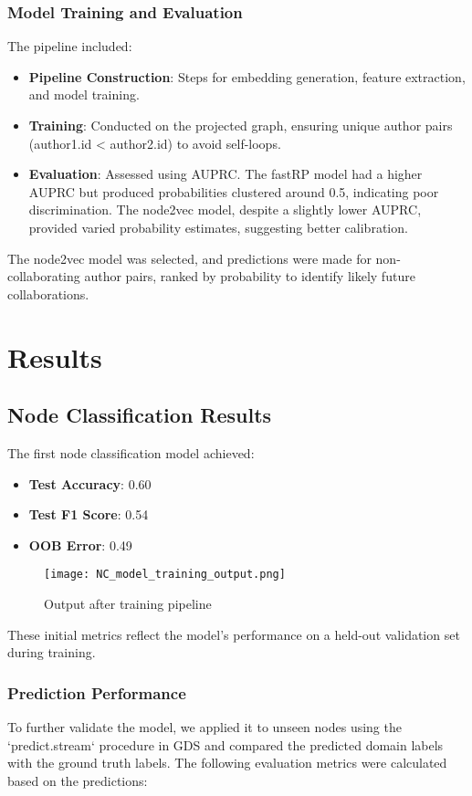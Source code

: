 \documentclass[conference, 12pt]{IEEEtran}
\begin{document}
\subsubsection{Model Training and Evaluation}
The pipeline included:
\begin{itemize}
  \item \textbf{Pipeline Construction}: Steps for embedding generation, feature extraction, and model training.
  \item \textbf{Training}: Conducted on the projected graph, ensuring unique author pairs (author1.id < author2.id) to avoid self-loops.
  \item \textbf{Evaluation}: Assessed using AUPRC. The fastRP model had a higher AUPRC but produced probabilities clustered around 0.5, indicating poor discrimination. The node2vec model, despite a slightly lower AUPRC, provided varied probability estimates, suggesting better calibration.
\end{itemize}
The node2vec model was selected, and predictions were made for non-collaborating author pairs, ranked by probability to identify likely future collaborations.

\section{Results}

\subsection{Node Classification Results}
The first node classification model achieved:
\begin{itemize}
  \item \textbf{Test Accuracy}: 0.60
  \item \textbf{Test F1 Score}: 0.54
  \item \textbf{OOB Error}: 0.49
\end{itemize}

\begin{figure}[h]
    \centering
    \texttt{[image: NC\_model\_training\_output.png]} 
    \caption{Output after training pipeline}
    \label{fig:classification_metrics}
\end{figure}

These initial metrics reflect the model’s performance on a held-out validation set during training.

\subsubsection{Prediction Performance}
To further validate the model, we applied it to unseen nodes using the `predict.stream` procedure in GDS and compared the predicted domain labels with the ground truth labels. The following evaluation metrics were calculated based on the predictions:
\end{document}
